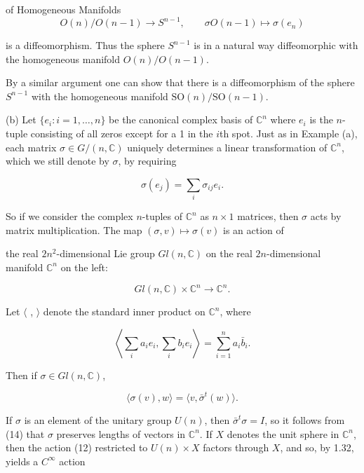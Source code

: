 \begin{examples}{of Homogeneous Manifolds}
\begin{equation}
\tag{10}\label{eq:3.65:10}
O(n)/O(n-1)\to S^{n-1},\qquad\sigma O(n-1)\mapsto\sigma(e_{n})
\end{equation}

is a diffeomorphism. Thus the sphere  $ S^{n-1} $ is in a natural way diffeomorphic with the homogeneous manifold  $ O(n)/O(n-1) $.

By a similar argument one can show that there is a diffeomorphism of the sphere  $ S^{n-1} $ with the homogeneous manifold  $ \mathrm{SO}(n)/\mathrm{SO}(n-1) $.

(b) Let $\{e_i: i = 1, \ldots, n\}$ be the canonical complex basis of $\mathbb{C}^n$ where $e_i$ is the $n$-tuple consisting of all zeros except for a 1 in the $i$th spot. Just as in Example (a), each matrix $\sigma \in G/(n, \mathbb{C})$ uniquely determines a linear transformation of $\mathbb{C}^n$, which we still denote by $\sigma$, by requiring

\begin{equation}
\tag{11}\label{eq:3.65:11}
\sigma(e_{j})=\sum_{i}\sigma_{i j}e_{i}.
\end{equation}

So if we consider the complex $n$-tuples of $\mathbb{C}^n$ as $n \times 1$ matrices, then $\sigma$ acts by matrix multiplication. The map $(\sigma, v) \mapsto \sigma(v)$ is an action of

the real $2n^{2}$-dimensional Lie group $Gl(n,\mathbb{C})$ on the real $2n$-dimensional manifold $\mathbb{C}^n$ on the left:

\begin{equation}
\tag{12}\label{eq:3.65:12}
Gl(n,\mathbb{C})\times\mathbb{C}^{n}\to\mathbb{C}^{n}.
\end{equation}

Let  $ \langle $ ,  $ \rangle $ denote the standard inner product on  $ \mathbb{C}^n $, where

\begin{equation}
\tag{13}\label{eq:3.65:13}
\left\langle\sum_{i}a_{i}e_{i},\sum_{i}b_{i}e_{i}\right\rangle=\sum_{i=1}^{n}a_{i}\bar{b}_{i}.
\end{equation}

Then if  $ \sigma \in Gl(n, \mathbb{C}) $,

\begin{equation}
\tag{14}\label{eq:3.65:14}
\langle\sigma(v),w\rangle=\langle v,\bar{\sigma}^{t}(w)\rangle.
\end{equation}

If $\sigma$ is an element of the unitary group $U(n)$, then $\bar{\sigma}^{t}\sigma=I$, so it follows from (14) that $\sigma$ preserves lengths of vectors in $\mathbb{C}^{n}$. If $X$ denotes the unit sphere in $\mathbb{C}^{n}$, then the action (12) restricted to $U(n) \times X$ factors through $X$, and so, by 1.32, yields a $C^{\infty}$ action


\end{examples}
